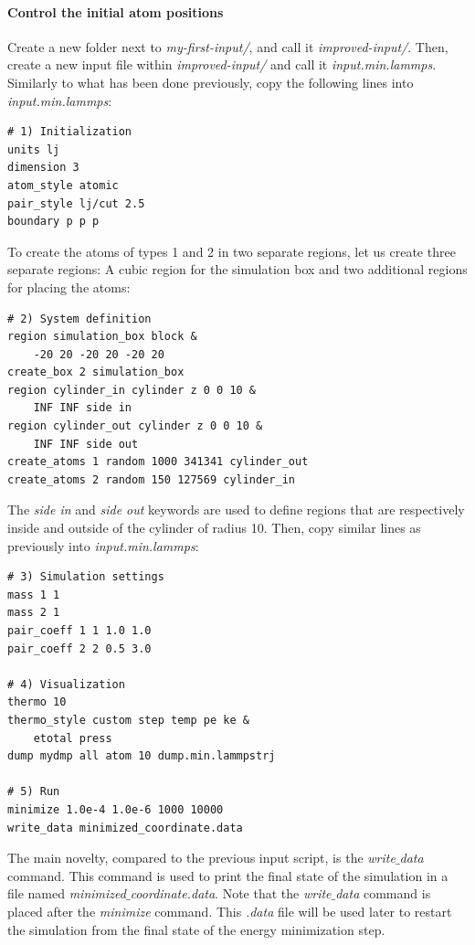 \documentclass[9pt,tutorial]{livecoms}
\begin{document}
\paragraph{Control the initial atom positions}
\noindent Create a new folder next to \textit{my-first-input/}, and call it \textit{improved-input/}. Then, create a new input file within \textit{improved-input/} and call it \textit{input.min.lammps}. Similarly to what has been done previously, copy the following lines into \textit{input.min.lammps}:
{\normalsize \begin{verbatim}
# 1) Initialization
units lj
dimension 3
atom_style atomic
pair_style lj/cut 2.5
boundary p p p
\end{verbatim}}
To create the atoms of types 1 and 2 in two separate regions, let us create three separate regions: A cubic region for the simulation box and two additional regions for placing the atoms:
{\normalsize \begin{verbatim}
# 2) System definition
region simulation_box block &
    -20 20 -20 20 -20 20
create_box 2 simulation_box
region cylinder_in cylinder z 0 0 10 &
    INF INF side in
region cylinder_out cylinder z 0 0 10 &
    INF INF side out
create_atoms 1 random 1000 341341 cylinder_out
create_atoms 2 random 150 127569 cylinder_in
\end{verbatim}}
The \textit{side in} and \textit{side out} keywords are used to define regions that are respectively inside and outside of the cylinder of radius 10. Then, copy similar lines as previously into \textit{input.min.lammps}:
{\normalsize \begin{verbatim}
# 3) Simulation settings
mass 1 1
mass 2 1
pair_coeff 1 1 1.0 1.0
pair_coeff 2 2 0.5 3.0

# 4) Visualization
thermo 10
thermo_style custom step temp pe ke &
    etotal press
dump mydmp all atom 10 dump.min.lammpstrj

# 5) Run
minimize 1.0e-4 1.0e-6 1000 10000
write_data minimized_coordinate.data
\end{verbatim}}
The main novelty, compared to the previous input script, is the \textit{write$\_$data} command. This command is used to print the final state of the simulation in a file named \textit{minimized$\_$coordinate.data}. Note that the \textit{write$\_$data} command is placed after the \textit{minimize} command. This \textit{.data} file will be used later to restart the simulation from the final state of the energy minimization step.
\end{document}
